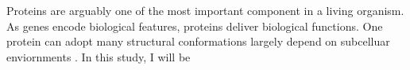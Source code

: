 Proteins are arguably one of the most important component in a living organism. As genes encode biological features, proteins deliver biological functions. One protein can adopt many structural conformations largely depend on subcelluar enviornments .    In this study, I will be 